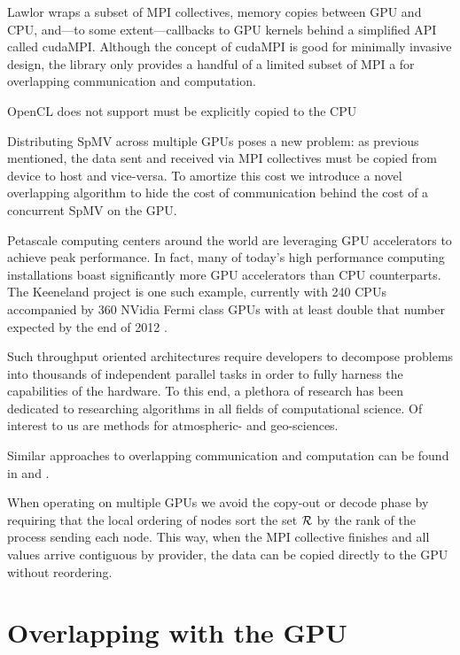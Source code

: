 Lawlor \cite{Lawlor2009} wraps a subset of MPI collectives, memory copies between GPU and CPU, and---to some extent---callbacks to GPU kernels behind a simplified API called cudaMPI. Although the concept of cudaMPI is good for minimally invasive design, the library only provides a handful of  a limited subset of MPI  a for overlapping communication and computation.  

OpenCL does not support must be explicitly copied to the CPU 




Distributing SpMV across multiple GPUs poses a new problem: as previous mentioned, the data sent and received via MPI collectives must be copied from device to host and vice-versa. To amortize this cost we introduce a novel overlapping algorithm to hide the cost of communication behind the cost of a concurrent SpMV on the GPU. 


Petascale computing centers around the world are leveraging GPU accelerators to achieve peak performance. In fact, many of today's high performance computing installations boast significantly more GPU accelerators than CPU counterparts. The Keeneland project is one such example, currently with 240 CPUs accompanied by 360 NVidia Fermi class GPUs with at least double that number expected by the end of 2012 \cite{Vetter2011}. 

Such throughput oriented architectures require developers to decompose problems into thousands of independent parallel tasks in order to fully harness the capabilities of the hardware. To this end, a plethora of research has been dedicated to researching algorithms in all fields of computational science. Of interest to us are methods for atmospheric- and geo-sciences. 


Similar approaches to overlapping communication and computation can be found in \cite{Schubert2011} and \cite{Thibault2009}.

When operating on multiple GPUs we avoid the copy-out or decode phase by requiring that the local ordering of nodes sort the set $\mathcal{R}$ by the rank of the process sending each node. This way, when the MPI collective finishes and all values arrive contiguous by provider, the data can be copied directly to the GPU without reordering.

\section{Overlapping with the GPU}

